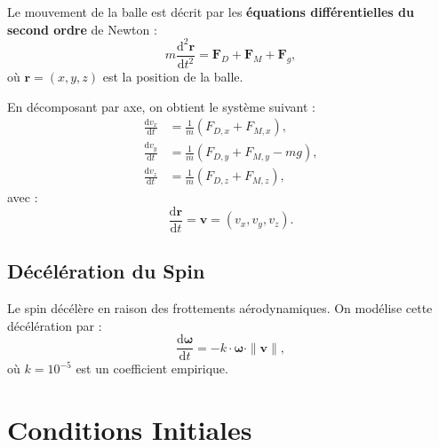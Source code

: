 \documentclass[11pt, a4paper]{article}
\newcommand{\vb}[1]{\mathbf{#1}}       %
\newcommand{\dd}{\mathrm{d}}             %
\begin{document}
Le mouvement de la balle est décrit par les \textbf{équations différentielles du second ordre} de Newton :
\begin{equation}
    m \frac{\dd^2 \vb{r}}{\dd t^2} = \vb{F}_D + \vb{F}_M + \vb{F}_g,
\end{equation}
où $\vb{r} = (x, y, z)$ est la position de la balle.

En décomposant par axe, on obtient le système suivant :
\begin{subequations}
    \label{eq:ode_system}
    \begin{align}
        \frac{\dd v_x}{\dd t} &= \frac{1}{m} \left( F_{D,x} + F_{M,x} \right), \\
        \frac{\dd v_y}{\dd t} &= \frac{1}{m} \left( F_{D,y} + F_{M,y} - m g \right), \\
        \frac{\dd v_z}{\dd t} &= \frac{1}{m} \left( F_{D,z} + F_{M,z} \right),
    \end{align}
\end{subequations}
avec :
\begin{equation}
    \frac{\dd \vb{r}}{\dd t} = \vb{v} = (v_x, v_y, v_z).
\end{equation}

\subsection{Décélération du Spin}
Le spin décélère en raison des frottements aérodynamiques. On modélise cette décélération par :
\begin{equation}
    \frac{\dd \vb{\omega}}{\dd t} = -k \cdot \vb{\omega} \cdot \|\vb{v}\|,
\end{equation}
où $k = 10^{-5}$ est un coefficient empirique.


\section{Conditions Initiales}
\label{sec:initial_conditions}
\end{document}
